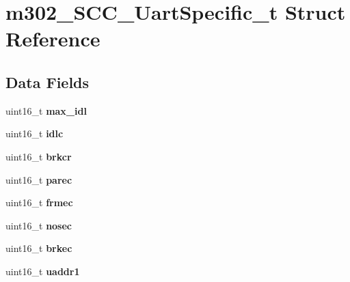 \hypertarget{structm302__SCC__UartSpecific__t}{}\section{m302\+\_\+\+S\+C\+C\+\_\+\+Uart\+Specific\+\_\+t Struct Reference}
\label{structm302__SCC__UartSpecific__t}
\subsection*{Data Fields}
\begin{DoxyCompactItemize}
\item 
\mbox{\label{structm302__SCC__UartSpecific__t_a09f020cc8a7e9c2a2c319c54a2a0292b}} 
uint16\+\_\+t {\bfseries max\+\_\+idl}
\item 
\mbox{\label{structm302__SCC__UartSpecific__t_a629e03b3c336bf3ccbfc95944afafa02}} 
uint16\+\_\+t {\bfseries idlc}
\item 
\mbox{\label{structm302__SCC__UartSpecific__t_a02e95c8b98c9d068e051bb7abd8e43ac}} 
uint16\+\_\+t {\bfseries brkcr}
\item 
\mbox{\label{structm302__SCC__UartSpecific__t_aee9af517737a18e25aa04a8f2483b576}} 
uint16\+\_\+t {\bfseries parec}
\item 
\mbox{\label{structm302__SCC__UartSpecific__t_a2448e282a59ba3017fa500caa62b32c4}} 
uint16\+\_\+t {\bfseries frmec}
\item 
\mbox{\label{structm302__SCC__UartSpecific__t_a626ef05925dc195e6c2cade95999a7c4}} 
uint16\+\_\+t {\bfseries nosec}
\item 
\mbox{\label{structm302__SCC__UartSpecific__t_a6726f56fe02dd04a1376c888f419fe4c}} 
uint16\+\_\+t {\bfseries brkec}
\item 
\mbox{\label{structm302__SCC__UartSpecific__t_a32cd1e77d27b3b23e261138da0e7ea60}} 
uint16\+\_\+t {\bfseries uaddr1}
\item 

\end{DoxyCompactItemize}

